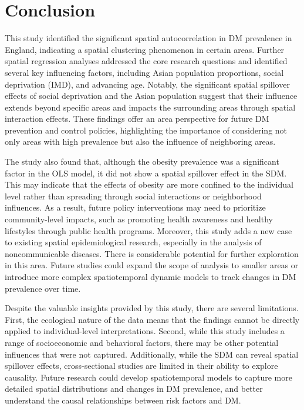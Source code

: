 \chapter{Conclusion}
\label{chap:6}

This study identified the significant spatial autocorrelation in DM prevalence in England, indicating a spatial clustering phenomenon in certain areas. Further spatial regression analyses addressed the core research questions and identified several key influencing factors, including Asian population proportions, social deprivation (IMD), and advancing age. Notably, the significant spatial spillover effects of social deprivation and the Asian population suggest that their influence extends beyond specific areas and impacts the surrounding areas through spatial interaction effects. These findings offer an area perspective for future DM prevention and control policies, highlighting the importance of considering not only areas with high prevalence but also the influence of neighboring areas.

The study also found that, although the obesity prevalence was a significant factor in the OLS model, it did not show a spatial spillover effect in the SDM. This may indicate that the effects of obesity are more confined to the individual level rather than spreading through social interactions or neighborhood influences. As a result, future policy interventions may need to prioritize community-level impacts, such as promoting health awareness and healthy lifestyles through public health programs.
Moreover, this study adds a new case to existing spatial epidemiological research, especially in the analysis of noncommunicable diseases. There is considerable potential for further exploration in this area. Future studies could expand the scope of analysis to smaller areas or introduce more complex spatiotemporal dynamic models to track changes in DM prevalence over time.

Despite the valuable insights provided by this study, there are several limitations. First, the ecological nature of the data means that the findings cannot be directly applied to individual-level interpretations. Second, while this study includes a range of socioeconomic and behavioral factors, there may be other potential influences that were not captured. Additionally, while the SDM can reveal spatial spillover effects, cross-sectional studies are limited in their ability to explore causality. Future research could develop spatiotemporal models to capture more detailed spatial distributions and changes in DM prevalence, and better understand the causal relationships between risk factors and DM.
